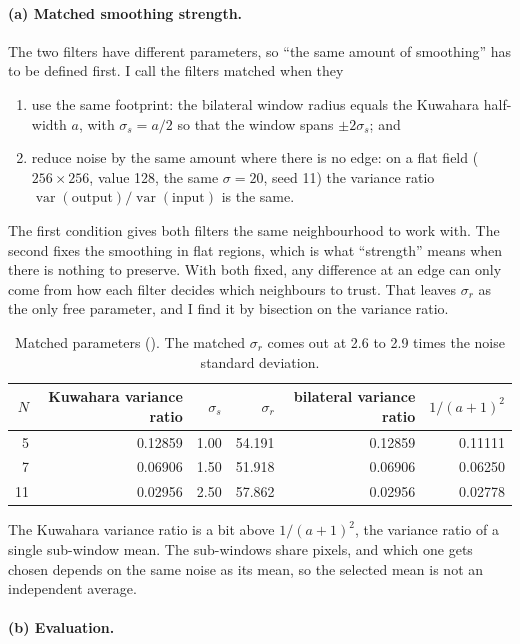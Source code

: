 \paragraph{(a) Matched smoothing strength.} The two filters have different
parameters, so ``the same amount of smoothing'' has to be defined first. I call
the filters matched when they
\begin{enumerate}
\item use the same footprint: the bilateral window radius equals the Kuwahara
half-width $a$, with $\sigma_s=a/2$ so that the window spans $\pm2\sigma_s$; and
\item reduce noise by the same amount where there is no edge: on a flat field
($256\times256$, value 128, the same $\sigma=20$, seed 11) the variance ratio
$\operatorname{var}(\text{output})/\operatorname{var}(\text{input})$ is the same.
\end{enumerate}
The first condition gives both filters the same neighbourhood to work with. The
second fixes the smoothing in flat regions, which is what ``strength'' means when
there is nothing to preserve. With both fixed, any difference at an edge can only
come from how each filter decides which neighbours to trust. That leaves
$\sigma_r$ as the only free parameter, and I find it by bisection on the variance
ratio.

\begin{table}[H]
\centering
\begin{tabular}{rrrrrr}
\toprule
$N$ & Kuwahara variance ratio & $\sigma_s$ & $\sigma_r$ & bilateral variance ratio & $1/(a+1)^2$\\
\midrule
5 & 0.12859 & 1.00 & 54.191 & 0.12859 & 0.11111\\
7 & 0.06906 & 1.50 & 51.918 & 0.06906 & 0.06250\\
11 & 0.02956 & 2.50 & 57.862 & 0.02956 & 0.02778\\
\bottomrule
\end{tabular}
\caption{Matched parameters (). The matched $\sigma_r$ comes
out at 2.6 to 2.9 times the noise standard deviation.}
\label{tab:match}
\end{table}

The Kuwahara variance ratio is a bit above $1/(a+1)^2$, the variance ratio of a
single sub-window mean. The sub-windows share pixels, and which one gets chosen
depends on the same noise as its mean, so the selected mean is not an
independent average.

\paragraph{(b) Evaluation.}

